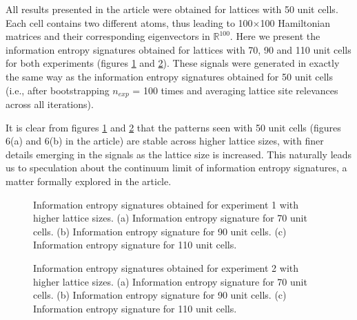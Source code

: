 \documentclass[10pt]{revtex4-1}
\newcommand\SSHOneEntropySignatureOneFourZero{./supp_ssh1_140_plot_feature_importances.png}
\newcommand\SSHOneEntropySignatureOneEightZero{./supp_ssh1_180_plot_feature_importances.png}
\newcommand\SSHOneEntropySignatureTwoTwoZero{./supp_ssh1_220_plot_feature_importances.png}
\newcommand\SSHTwoEntropySignatureOneFourZero{./supp_ssh2_140_plot_feature_importances.png}
\newcommand\SSHTwoEntropySignatureOneEightZero{./supp_ssh2_180_plot_feature_importances.png}
\newcommand\SSHTwoEntropySignatureTwoTwoZero{./supp_ssh2_220_plot_feature_importances.png}
\begin{document}
All results presented in the article were obtained for lattices with 50 unit cells. Each cell contains two different atoms, thus leading to 100$\times$100 Hamiltonian matrices and their corresponding eigenvectors in $\mathbb{R}^{100}$. Here we present the information entropy signatures obtained for lattices with 70, 90 and 110 unit cells for both experiments (figures \ref{feature_importances_ssh1_longer_lattices} and \ref{feature_importances_ssh2_longer_lattices}). These signals were generated in exactly the same way as the information entropy signatures obtained for 50 unit cells (i.e., after bootstrapping $n_{exp}$ = 100 times and averaging lattice site relevances across all iterations).

It is clear from figures \ref{feature_importances_ssh1_longer_lattices} and \ref{feature_importances_ssh2_longer_lattices} that the patterns seen with 50 unit cells (figures 6(a) and 6(b) in the article) are stable across higher lattice sizes, with finer details emerging in the signals as the lattice size is increased. This naturally leads us to speculation about the continuum limit of information entropy signatures, a matter formally explored in the article.  

\begin{figure}
\centering
{}
\caption{Information entropy signatures obtained for experiment 1 with higher lattice sizes. (a) Information entropy signature for 70 unit cells. (b) Information entropy signature for 90 unit cells. (c) Information entropy signature for 110 unit cells.}
\label{feature_importances_ssh1_longer_lattices}
\end{figure}
\begin{figure}
\centering
{}
\caption{Information entropy signatures obtained for experiment 2 with higher lattice sizes. (a) Information entropy signature for 70 unit cells. (b) Information entropy signature for 90 unit cells. (c) Information entropy signature for 110 unit cells.}
\label{feature_importances_ssh2_longer_lattices}
\end{figure}
\end{document}
